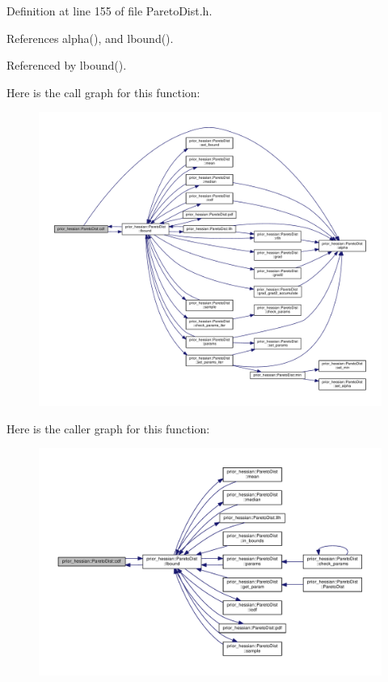 Definition at line 155 of file Pareto\+Dist.\+h.



References alpha(), and lbound().



Referenced by lbound().



Here is the call graph for this function\+:\nopagebreak
\begin{figure}[H]
\begin{center}
\leavevmode
\includegraphics[width=350pt]{classprior__hessian_1_1ParetoDist_afe706cb12ce6f667e7a3a9eb7311ef65_cgraph}
\end{center}
\end{figure}




Here is the caller graph for this function\+:\nopagebreak
\begin{figure}[H]
\begin{center}
\leavevmode
\includegraphics[width=350pt]{classprior__hessian_1_1ParetoDist_afe706cb12ce6f667e7a3a9eb7311ef65_icgraph}
\end{center}
\end{figure}


